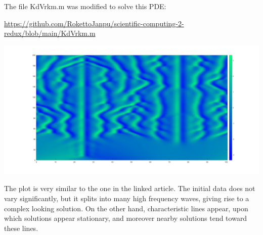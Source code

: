 \documentclass{article}
\begin{document}
\begin{enumerate}
The file KdVrkm.m was modified to solve this PDE:

\url{https://github.com/RokettoJanpu/scientific-computing-2-redux/blob/main/KdVrkm.m}
\begin{center}
	\includegraphics[scale=.3]{hw13 q4 plot}
\end{center}
The plot is very similar to the one in the linked article. The initial data does not vary significantly, but it splits into many high frequency waves, giving rise to a complex looking solution. On the other hand, characteristic lines appear, upon which solutions appear stationary, and moreover nearby solutions tend toward these lines.

\end{enumerate}
\end{document}

